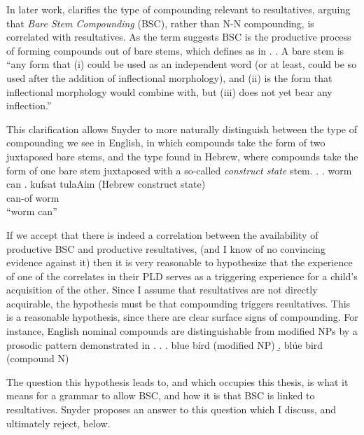 \documentclass[MilwayThesis]{subfiles}
\begin{document}

In later work, \textcite{snyder2016compound} clarifies the type of compounding relevant to resultatives, arguing that \textit{Bare Stem Compounding} (BSC), rather than N-N compounding, is correlated with resultatives.
As the term suggests BSC is the productive process of forming compounds out of bare stems, which \textcite{snyder2016compound} defines as in \Next.
\ex. A bare stem is ``any form that (i) could be used as an independent word (or at least, could be so used after the addition of inflectional morphology), and (ii) is the form that inflectional morphology would combine with, but (iii) does not yet bear any inflection.'' \parencite[90]{snyder2016compound} 

This clarification allows Snyder to more naturally distinguish between the type of compounding we see in English, in which compounds take the form of two juxtaposed bare stems, and the type found in Hebrew, where compounds take the form of one bare stem juxtaposed with a so-called \textit{construct state} stem.
\ex.
\a. worm can 
\bg. kufsat tulaAim {(Hebrew construct state)}\\
can-of worm {}\\
``worm can''\hfill\parencite[338]{snyder2001nature}


If we accept that there is indeed a correlation between the availability of productive BSC and productive resultatives, (and I know of no convincing evidence against it) then it is very reasonable to hypothesize that the experience of one of the correlates in their PLD serves as a triggering experience for a child's acquisition of the other.
Since I assume that resultatives are not directly acquirable, the hypothesis must be that compounding triggers resultatives.
This is a reasonable hypothesis, since there are clear surface signs of compounding.
For instance, English nominal compounds are distinguishable from modified NPs by a prosodic pattern demonstrated in \Next.
\ex.
\a. blue b\'ird (modified NP)
\b. bl\'ue bird (compound N)

The question this hypothesis leads to, and which occupies this thesis, is what it means for a grammar to allow BSC, and how it is that BSC is linked to resultatives.
Snyder proposes an answer to this question which I discuss, and ultimately reject, below.
\end{document}
